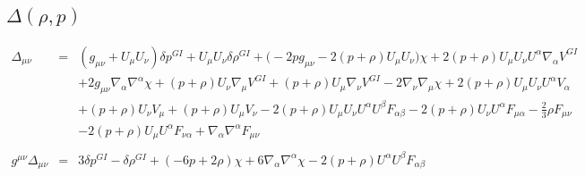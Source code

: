 \documentclass[10pt,letterpaper]{article}
\numberwithin{equation}{section}
\begin{document}
\subsection{$\Delta(\rho,p)$}
%
\begin{eqnarray}
\Delta_{\mu\nu}&=& (g_{\mu \nu } + U_{\mu } U_{\nu }) \delta p^{GI}{} + U_{\mu } U_{\nu } \delta \rho^{GI}{} + \bigl(-2 p g_{\mu \nu } - 2 (p + \rho) U_{\mu } U_{\nu }\bigr) \chi + 2 (p + \rho) U_{\mu } U_{\nu } U^{\alpha } \nabla_{\alpha }V^{GI}{} \nonumber \\ 
&& + 2 g_{\mu \nu } \nabla_{\alpha }\nabla^{\alpha }\chi + (p + \rho) U_{\nu } \nabla_{\mu }V^{GI}{} + (p + \rho) U_{\mu } \nabla_{\nu }V^{GI}{} - 2 \nabla_{\nu }\nabla_{\mu }\chi +2 (p + \rho) U_{\mu } U_{\nu } U^{\alpha } V_{\alpha } \nonumber \\ 
&& + (p + \rho) U_{\nu } V_{\mu } + (p + \rho) U_{\mu } V_{\nu }-2 (p + \rho) U_{\mu } U_{\nu } U^{\alpha } U^{\beta } F_{\alpha \beta } - 2 (p + \rho) U_{\nu } U^{\alpha } F_{\mu \alpha } -  \tfrac{2}{3} \rho F_{\mu \nu } \nonumber \\ 
&& - 2 (p + \rho) U_{\mu } U^{\alpha } F_{\nu \alpha } + \nabla_{\alpha }\nabla^{\alpha }F_{\mu \nu }
\\  \nonumber\\ 
g^{\mu\nu}\Delta_{\mu\nu}&=& 3 \delta p^{GI}{} -  \delta \rho^{GI}{} + (-6 p + 2 \rho) \chi + 6 \nabla_{\alpha }\nabla^{\alpha }\chi -2 (p + \rho) U^{\alpha } U^{\beta } F_{\alpha \beta }
\end{eqnarray}
\\ \\
%
%
\end{document}
